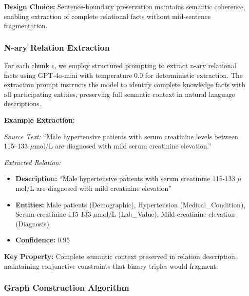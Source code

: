 \documentclass[11pt,a4paper]{article}
\begin{document}
\textbf{Design Choice:} Sentence-boundary preservation maintains semantic coherence, enabling extraction of complete relational facts without mid-sentence fragmentation.

\subsubsection{N-ary Relation Extraction}

For each chunk $c$, we employ structured prompting to extract n-ary relational facts using GPT-4o-mini with temperature 0.0 for deterministic extraction. The extraction prompt instructs the model to identify complete knowledge facts with all participating entities, preserving full semantic context in natural language descriptions.

\textbf{Example Extraction:}

\textit{Source Text:} ``Male hypertensive patients with serum creatinine levels between 115--133 $\mu$mol/L are diagnosed with mild serum creatinine elevation.''

\textit{Extracted Relation:}
\begin{itemize}
    \item \textbf{Description:} ``Male hypertensive patients with serum creatinine 115-133 $\mu$mol/L are diagnosed with mild creatinine elevation''
    \item \textbf{Entities:} Male patients (Demographic), Hypertension (Medical\_Condition), Serum creatinine 115-133 $\mu$mol/L (Lab\_Value), Mild creatinine elevation (Diagnosis)
    \item \textbf{Confidence:} 0.95
\end{itemize}

\textbf{Key Property:} Complete semantic context preserved in relation description, maintaining conjunctive constraints that binary triples would fragment.

\subsubsection{Graph Construction Algorithm}
\end{document}
